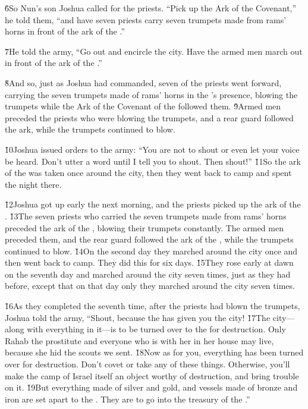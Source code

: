 \v{6}So Nun's son Joshua called for the priests. ``Pick up the Ark of the Covenant,'' he told them, ``and have seven priests carry seven trumpets made from rams' horns in front of the ark of the .''

\v{7}He told the army, ``Go out and encircle the city. Have the armed men march out in front of the ark of the .''

\v{8}And so, just as Joshua had commanded, seven of the priests went forward, carrying the seven trumpets made of rams' horns in the 's presence, blowing the trumpets while the Ark of the Covenant of the  followed them. \v{9}Armed men preceded the priests who were blowing the trumpets, and a rear guard followed the ark, while the trumpets continued to blow.

\v{10}Joshua issued orders to the army: ``You are not to shout or even let your voice be heard. Don't utter a word until I tell you to shout. Then shout!'' \v{11}So the ark of the  was taken once around the city, then they went back to camp and spent the night there.

\v{12}Joshua got up early the next morning, and the priests picked up the ark of the . \v{13}The seven priests who carried the seven trumpets made from rams' horns preceded the ark of the , blowing their trumpets constantly. The armed men preceded them, and the rear guard followed the ark of the , while the trumpets continued to blow. \v{14}On the second day they marched around the city once and then went back to camp. They did this for six days. \v{15}They rose early at dawn on the seventh day and marched around the city seven times, just as they had before, except that on that day only they marched around the city seven times.

\v{16}As they completed the seventh time, after the priests had blown the trumpets, Joshua told the army, ``Shout, because the  has given you the city! \v{17}The city---along with everything in it---is to be turned over to the  for destruction. Only Rahab the prostitute and everyone who is with her in her house may live, because she hid the scouts we sent. \v{18}Now as for you, everything has been turned over for destruction. Don't covet or take any of these things. Otherwise, you'll make the camp of Israel itself an object worthy of destruction, and bring trouble on it. \v{19}But everything made of silver and gold, and vessels made of bronze and iron are set apart to the . They are to go into the treasury of the .''

